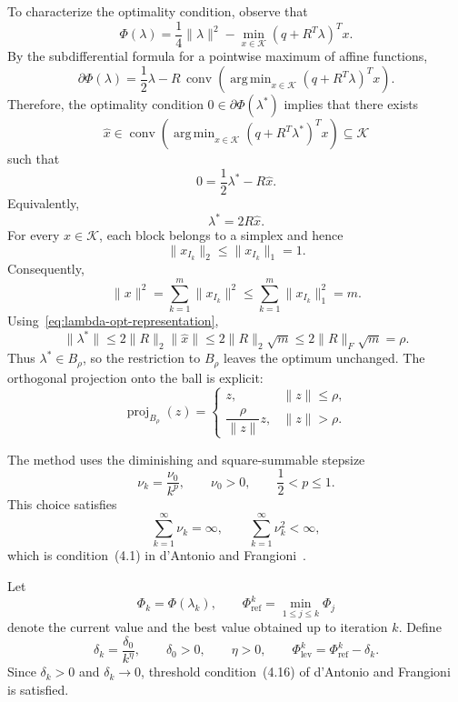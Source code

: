 \documentclass[12pt]{article}
\newcommand{\Kset}{\mathcal{K}}
\DeclareMathOperator*{\argmin}{arg\,min}
\DeclareMathOperator{\proj}{proj}
\begin{document}
To characterize the optimality condition, observe that
\[
\Phi(\lambda)
=\frac14\|\lambda\|^2
-\min_{x\in\Kset}(q+R^T\lambda)^Tx.
\]
By the subdifferential formula for a pointwise maximum of affine functions,
\begin{equation}
\partial\Phi(\lambda)
=\frac12\lambda
-R\,\operatorname{conv}\left(
\argmin_{x\in\Kset}(q+R^T\lambda)^Tx
\right).
\label{eq:phi-subdifferential}
\end{equation}
Therefore, the optimality condition $0\in\partial\Phi(\lambda^*)$ implies that there exists
\[
\widehat x\in
\operatorname{conv}\left(
\argmin_{x\in\Kset}(q+R^T\lambda^*)^Tx
\right)
\subseteq\Kset
\]
such that
\[
0=\frac12\lambda^*-R\widehat x.
\]
Equivalently,
\begin{equation}
\lambda^*=2R\widehat x.
\label{eq:lambda-opt-representation}
\end{equation}
For every $x\in\Kset$, each block belongs to a simplex and hence
\[
\|x_{I_k}\|_2\le\|x_{I_k}\|_1=1.
\]
Consequently,
\[
\|x\|^2
=\sum_{k=1}^m\|x_{I_k}\|^2
\le\sum_{k=1}^m\|x_{I_k}\|_1^2
=m.
\]
Using~\eqref{eq:lambda-opt-representation},
\begin{equation}
\|\lambda^*\|
\le2\|R\|_2\|\widehat x\|
\le2\|R\|_2\sqrt m
\le2\|R\|_F\sqrt m
=\rho.
\label{eq:lambda-opt-bound}
\end{equation}
Thus $\lambda^*\in B_\rho$, so the restriction to $B_\rho$ leaves the optimum unchanged. The orthogonal projection onto the ball is explicit:
\begin{equation}
\proj_{B_\rho}(z)=
\begin{cases}
z,&\|z\|\le\rho,\\[1mm]
\dfrac{\rho}{\|z\|}z,&\|z\|>\rho.
\end{cases}
\label{eq:ball-projection}
\end{equation}

The method uses the diminishing and square-summable stepsize
\begin{equation}
\nu_k=\frac{\nu_0}{k^p},
\qquad \nu_0>0,
\qquad \frac12<p\le1.
\label{eq:diminishing-step}
\end{equation}
This choice satisfies
\begin{equation}
\sum_{k=1}^{\infty}\nu_k=\infty,
\qquad
\sum_{k=1}^{\infty}\nu_k^2<\infty,
\label{eq:step-condition}
\end{equation}
which is condition~(4.1) in d'Antonio and Frangioni~\cite[p.~375]{dantoniofrangioni}.

Let
\begin{equation}
\Phi_k=\Phi(\lambda_k),
\qquad
\Phi_{\mathrm{ref}}^k=\min_{1\le j\le k}\Phi_j
\label{eq:record-phi}
\end{equation}
denote the current value and the best value obtained up to iteration $k$. Define
\begin{equation}
\delta_k=\frac{\delta_0}{k^\eta},
\qquad \delta_0>0,
\qquad \eta>0,
\qquad
\Phi_{\mathrm{lev}}^k=\Phi_{\mathrm{ref}}^k-\delta_k.
\label{eq:target-level}
\end{equation}
Since $\delta_k>0$ and $\delta_k\to0$, threshold condition~(4.16) of d'Antonio and Frangioni~\cite[p.~381]{dantoniofrangioni} is satisfied.
\end{document}
